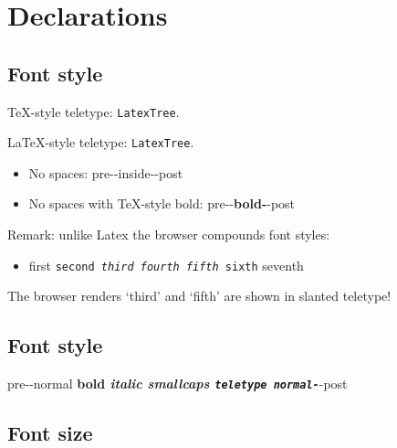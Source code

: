
\section{Declarations}

\subsection{Font style}
\label{ss:font-style-dec}

TeX-style teletype: {\tt LatexTree}.
\par
LaTeX-style teletype: \texttt{LatexTree}.

\begin{itemize}
\item No spaces: pre-{-inside-}-post
\item No spaces with TeX-style bold: pre-{-\bf bold-}-post
\end{itemize}

Remark: unlike Latex the browser compounds font styles:
\begin{itemize}
\item 
first {\tt second {\it third {\sc fourth} fifth} sixth} seventh
\end{itemize}
The browser renders `third' and `fifth' are shown in slanted teletype!

\subsection{Font style}
\label{ss:font-style-dec}


pre-{-normal \bf bold \it italic \sc smallcaps \tt teletype \normalfont normal-}-post

\subsection{Font size}
\label{ss:font-size-dec}


